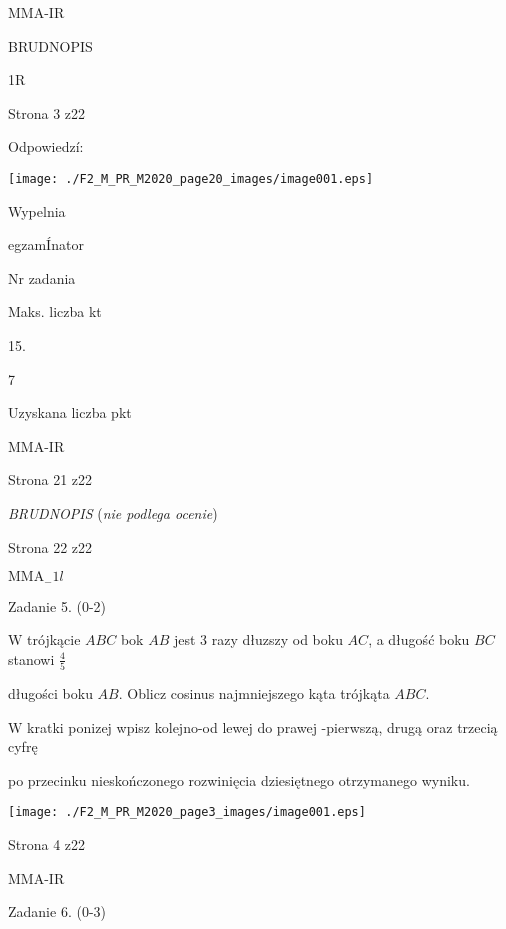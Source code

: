 \documentclass[a4paper,12pt]{article}
\begin{document}
MMA-IR





BRUDNOPIS

1R

Strona 3 z22





Odpowiedzí:
\begin{center}
\texttt{[image: ./F2\_M\_PR\_M2020\_page20\_images/image001.eps]}
\end{center}
Wypelnia

egzamÍnator

Nr zadania

Maks. liczba kt

15.

7

Uzyskana liczba pkt

MMA-IR

Strona 21 z22





{\it BRUDNOPIS} ({\it nie podlega ocenie})

Strona 22 z22

$\mathrm{M}\mathrm{M}\mathrm{A}_{-}1l$















Zadanie 5. (0-2)

$\mathrm{W}$ trójkącie $ABC$ bok $AB$ jest 3 razy dłuzszy od boku $AC$, a długość boku $BC$ stanowi $\displaystyle \frac{4}{5}$

długości boku $AB$. Oblicz cosinus najmniejszego kąta trójkąta $ABC.$

$\mathrm{W}$ kratki ponizej wpisz kolejno-od lewej do prawej -pierwszą, drugą oraz trzecią cyfrę

po przecinku nieskończonego rozwinięcia dziesiętnego otrzymanego wyniku.
\begin{center}
\texttt{[image: ./F2\_M\_PR\_M2020\_page3\_images/image001.eps]}
\end{center}
Strona 4 z22

MMA-IR





Zadanie 6. (0-3)
\end{document}
